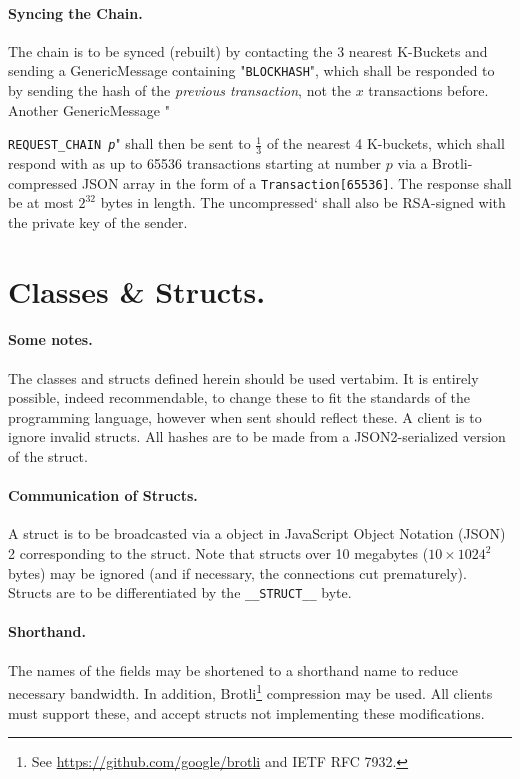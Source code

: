 \documentclass{article}
\begin{document}
\paragraph{Syncing the Chain.} The chain is to be synced (rebuilt) by
contacting the 3 nearest K-Buckets and sending a GenericMessage containing
"{\texttt{BLOCKHASH}}", which shall be responded to by sending the hash of the
{\it{previous transaction}}, not the $x$ transactions before. Another
GenericMessage "{\texttt{REQUEST\_CHAIN {\it{p}}}" shall then be sent to
$\frac{1}{3}$ of the nearest 4 K-buckets, which shall respond with as up to
65536 transactions starting at number $p$ via a Brotli-compressed JSON array in
the form of a \verb|Transaction[65536]|. The response shall be at most
$2^{32}$ bytes in length. The uncompressed` shall also be RSA-signed with the
private key of the sender.

\section{Classes \& Structs.}
\paragraph{Some notes.} The classes and structs defined herein should be used
vertabim. It is entirely possible, indeed recommendable, to change these to fit
the standards of the programming language, however when sent should reflect
these. A client is to ignore invalid structs. All hashes are to be made from
a JSON2-serialized version of the struct.

\paragraph{Communication of Structs.} A struct is to be broadcasted via a
object in JavaScript Object Notation (JSON) 2 corresponding to the struct.
Note that structs over 10 megabytes ($10 \times 1024^2$ bytes) may be ignored
(and if necessary, the connections cut prematurely). Structs are to be
differentiated by the \verb|__STRUCT__|  byte.

\paragraph{Shorthand.} The names of the fields may be shortened to a
shorthand name to reduce necessary bandwidth. In addition,
Brotli\footnote{See \url{https://github.com/google/brotli} and IETF RFC 7932.}
compression may be used. All clients must support these, and accept structs not
implementing these modifications.

}
\end{document}

